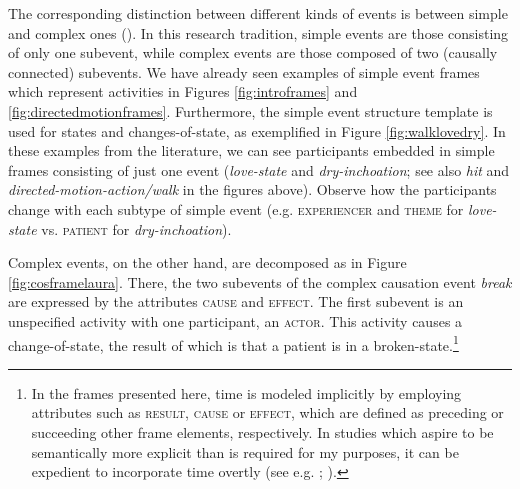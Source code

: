 The corresponding distinction between different kinds of events is between simple and complex ones (\citealt{Pustejovsky.1991,Pustejovsky.1995,VanValinJr.1997,RappaportHovav.1998,Levin.1999}). In this research tradition, simple events are those consisting of only one subevent, while complex events are those composed of two (causally connected) subevents. We have already seen examples of simple event frames which represent activities in Figures \ref{fig:introframes} and \ref{fig:directedmotionframes}.  
Furthermore, the simple event structure template is used for states and changes-of-state, as exemplified in Figure \ref{fig:walklovedry}. In these examples from the literature, we can see participants embedded in simple frames consisting of just one event (\textit{love-state} and \textit{dry-inchoation}; see also \textit{hit} and \textit{directed-motion-action/walk} in the figures above). Observe how the participants change with each subtype of simple event (e.g. \textsc{experiencer} and \textsc{theme} for \textit{love-state} vs. \textsc{patient} for \textit{dry-inchoation}).

Complex events, on the other hand, are decomposed as in Figure \ref{fig:cosframelaura}. There, the two subevents of the complex causation event \textit{break} are expressed by the attributes \textsc{cause} and \textsc{effect}. 
The first subevent is an unspecified activity with one participant, an \textsc{actor}. This activity causes a change-of-state, the result of which is that a patient is in a broken-state.\footnote{In the frames presented here, time is modeled implicitly by employing attributes such as \textsc{result, cause} or \textsc{effect}, which are defined as preceding or succeeding other frame elements, respectively. In studies which aspire to be semantically more explicit than is required for my purposes, it can be expedient to incorporate time overtly (see e.g. \citealt{Gamerschlag.2014b}; \citealt[109]{Loebner.2017}).}


